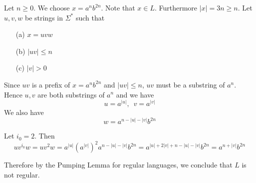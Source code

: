 Let $n \geq 0$.
We choose $x = a^n b^{2n}$. Note that $x \in L$.
Furthermore $|x| = 3n \geq n$.
Let $u,v,w$ be strings in $\Sigma^*$ such that
\begin{enumerate}[label=\textnormal{(\alph*)},itemsep=0pt,nosep,noitemsep,partopsep=0pt,topsep=0pt,parsep=0pt]
 \item[(a)] $x = uvw$
 \item[(b)] $|uv| \leq n$
 \item[(c)] $|v| > 0$
\end{enumerate}
 
Since $uv$ is a prefix of $x = a^n b^{2n}$
and $|uv| \leq n$, $uv$ must be a substring of $a^n$.
Hence $u,v$ are both substrings of $a^n$ and we have
\[
u = a^{|u|}, \,\,\, 
v = a^{|v|}
\]
We also have
\[
w = a^{n - |u| - |v|} b^{2n}
\]

Let $i_0 = 2$. Then
\[
uv^{i_0}w
= uv^2w 
= a^{|u|} (a^{|v|})^2 a^{n - |u| - |v|} b^{2n}
= a^{|u| + 2|v| + n - |u| - |v|} b^{2n}
= a^{n + |v|} b^{2n}
\]

Therefore by the Pumping Lemma for regular languages, we 
conclude that $L$ is not regular.
